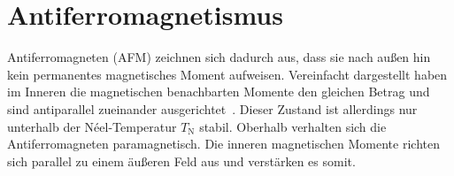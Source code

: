     \section{Antiferromagnetismus} \label{sec:AFM}
        Antiferromagneten (AFM) zeichnen sich dadurch aus, dass sie nach außen hin kein permanentes magnetisches Moment aufweisen.
        Vereinfacht dargestellt haben im Inneren die magnetischen benachbarten Momente den gleichen Betrag und sind antiparallel zueinander ausgerichtet~\cite{Suter}.
        Dieser Zustand ist allerdings nur unterhalb der Néel-Temperatur $T_\text{N}$ stabil.
        Oberhalb verhalten sich die Antiferromagneten paramagnetisch.
        Die inneren magnetischen Momente richten sich parallel zu einem äußeren Feld aus und verstärken es somit.

